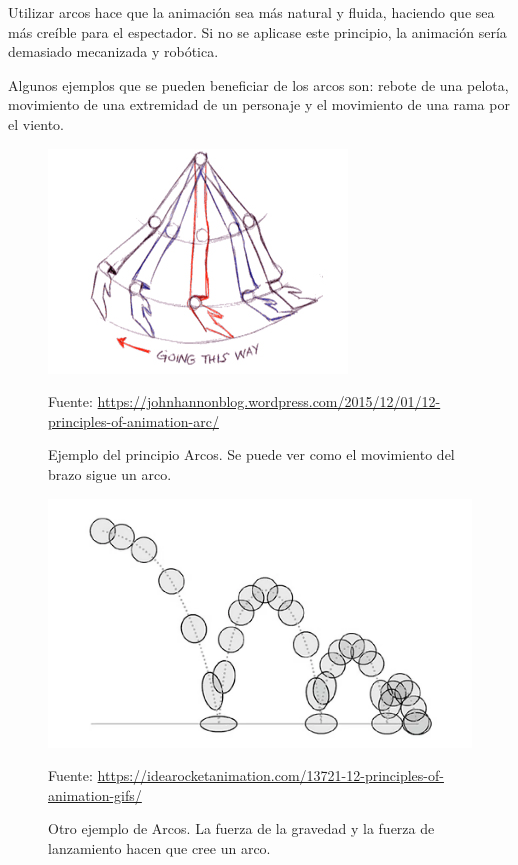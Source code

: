 \documentclass{article}
\begin{document}
Utilizar arcos hace que la animación sea más natural y fluida, haciendo que sea más creíble para el espectador. Si no se aplicase este principio, la animación sería demasiado mecanizada y robótica.

\bigskip

Algunos ejemplos que se pueden beneficiar de los arcos son: rebote de una pelota, movimiento de una extremidad de un personaje y el movimiento de una rama por el viento.

\begin{figure}[H]
    \centering
    \includegraphics[width=\textwidth]{imagenes/arm-arc.jpg}
    \caption{Ejemplo del principio Arcos. Se puede ver como el movimiento del brazo sigue un arco.}
    \vspace{10pt}
    \footnotesize{Fuente: \url{https://johnhannonblog.wordpress.com/2015/12/01/12-principles-of-animation-arc/}}
\end{figure}

\begin{figure}[H]
    \centering
    \includegraphics[width=\textwidth]{imagenes/bouncing-ball.png}
    \caption{Otro ejemplo de Arcos. La fuerza de la gravedad y la fuerza de lanzamiento hacen que cree un arco.}
    \vspace{10pt}
    \footnotesize{Fuente: \url{https://idearocketanimation.com/13721-12-principles-of-animation-gifs/}}
\end{figure}
\end{document}
